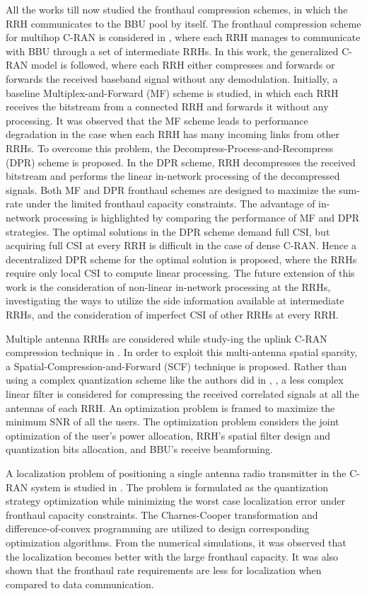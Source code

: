 \begin{multicols}{2}
\begin{itemize}
All the works till now studied the fronthaul compression schemes, in which the RRH communicates to the BBU pool by itself. The fronthaul compression scheme for multihop C-RAN is considered in \cite{art3-key56}, where each RRH manages to communicate with BBU through a set of intermediate RRHs. In this work, the generalized C-RAN model is followed, where each RRH either compresses and forwards or forwards the received baseband signal without any demodulation. Initially, a baseline Multiplex-and-Forward (MF) scheme is studied, in which each RRH receives the bitstream from a connected RRH and forwards it without any processing. It was observed that the MF scheme leads to performance degradation in the case when each RRH has many incoming links from other RRHs. To overcome this problem, the Decompress-Process-and-Recompress (DPR) scheme is proposed. In the DPR scheme, RRH decompresses the received bitstream and performs the linear in-network processing of the decompressed signals. Both MF and DPR fronthaul schemes are designed to maximize the sum-rate under the limited fronthaul capacity constraints. The advantage of in-network processing is highlighted by comparing the performance of MF and DPR strategies. The optimal solutions in the DPR scheme demand full CSI, but acquiring full CSI at every RRH is difficult in the case of dense C-RAN. Hence a decentralized DPR scheme for the optimal solution is proposed, where the RRHs require only local CSI to compute linear processing. The future extension of this work is the consideration of non-linear in-network processing at the RRHs, investigating the ways to utilize the side information available at intermediate RRHs, and the consideration of imperfect CSI of other RRHs at every RRH.

Multiple antenna RRHs are considered while study-ing the uplink C-RAN compression technique in \cite{art3-key57}. In order to exploit this multi-antenna spatial sparsity, a Spatial-Compression-and-Forward (SCF) technique is proposed. Rather than using a complex quantization scheme like the authors did in \cite{art3-key51}, \cite{art3-key53}, a less complex linear filter is considered for compressing the received correlated signals at all the antennas of each RRH. An optimization problem is framed to maximize the minimum SNR of all the users. The optimization problem considers the joint optimization of the user’s power allocation, RRH’s spatial filter design and quantization bits allocation, and BBU’s receive beamforming.

A localization problem of positioning a single antenna radio transmitter in the C-RAN system is studied in \cite{art3-key58}. The problem is formulated as the quantization strategy optimization while minimizing the worst case localization error under fronthaul capacity constraints. The Charnes-Cooper transformation and difference-of-convex programming are utilized to design corresponding optimization algorithms. From the numerical simulations, it was observed that the localization becomes better with the large fronthaul capacity. It was also shown that the fronthaul rate requirements are less for localization when compared to data communication.


\end{itemize}
\end{multicols}
